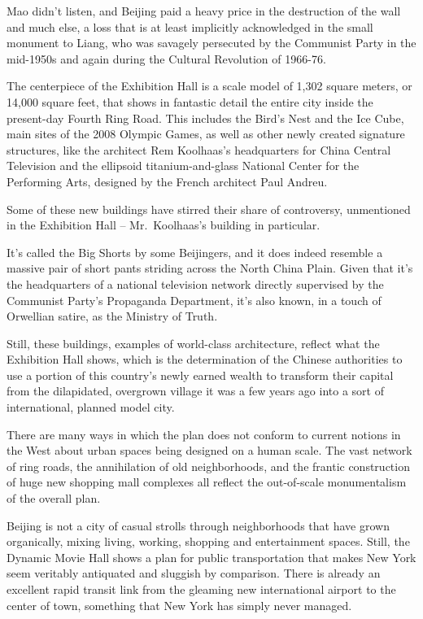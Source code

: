 ﻿\documentclass[12pt]{article}
\begin{document}
Mao didn't listen, and Beijing paid a heavy price in the destruction of the wall and much else, a
loss that is at least implicitly acknowledged in the small monument to Liang, who was savagely
persecuted by the Communist Party in the mid-1950s and again during the Cultural Revolution of
1966-76.

The centerpiece of the Exhibition Hall is a scale model of 1,302 square meters, or 14,000 square
feet, that shows in fantastic detail the entire city inside the present-day Fourth Ring Road. This
includes the Bird's Nest and the Ice Cube, main sites of the 2008 Olympic Games, as well as other
newly created signature structures, like the architect Rem Koolhaas's headquarters for China Central
Television and the ellipsoid titanium-and-glass National Center for the Performing Arts, designed by
the French architect Paul Andreu.

Some of these new buildings have stirred their share of controversy, unmentioned in the Exhibition
Hall -- Mr.~Koolhaas's building in particular.

It's called the Big Shorts by some Beijingers, and it does indeed resemble a massive pair of short
pants striding across the North China Plain. Given that it's the headquarters of a national
television network directly supervised by the Communist Party's Propaganda Department, it's also
known, in a touch of Orwellian satire, as the Ministry of Truth.

Still, these buildings, examples of world-class architecture, reflect what the Exhibition Hall
shows, which is the determination of the Chinese authorities to use a portion of this country's
newly earned wealth to transform their capital from the dilapidated, overgrown village it was a few
years ago into a sort of international, planned model city.

There are many ways in which the plan does not conform to current notions in the West about urban
spaces being designed on a human scale. The vast network of ring roads, the annihilation of old
neighborhoods, and the frantic construction of huge new shopping mall complexes all reflect the
out-of-scale monumentalism of the overall plan.

Beijing is not a city of casual strolls through neighborhoods that have grown organically, mixing
living, working, shopping and entertainment spaces. Still, the Dynamic Movie Hall shows a plan for
public transportation that makes New York seem veritably antiquated and sluggish by comparison.
There is already an excellent rapid transit link from the gleaming new international airport to the
center of town, something that New York has simply never managed.
\end{document}
